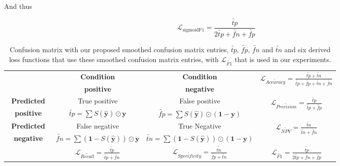 And thus

\begin{equation}
\mathcal{L}_{\text {sigmoidF1}}= \frac{\widetilde{\mathit{tp}}}{2 \widetilde{\mathit{tp}}+ \widetilde{\mathit{fn}}+ \widetilde{\mathit{fp}}}
\end{equation}

 \cite{smoothHinge}

\begin{table}[]
\caption{Confusion matrix with our proposed smoothed confusion matrix entries, $\widetilde{\mathit{tp}}$, $\widetilde{\mathit{fp}}$, $\widetilde{\mathit{fn}}$ and $\widetilde{\mathit{tn}}$ and six derived loss functions that use these smoothed confusion matrix entries, with $\mathcal{L}_{\widetilde{\mathit{F1}}}$ that is used in our experiments.}
\def\arraystretch{1.1}
\begin{tabular}{|c||c|c||c|} \cline{2-4}
\multicolumn{1}{l|}{} & \textbf{Condition} & \textbf{Condition} & \multirow{2}{*}{$\mathcal{L}_{\widetilde{\mathit{Accuracy}}}= \frac{\widetilde{\mathit{tp}} + \widetilde{\mathit{tn}}}{\widetilde{\mathit{tp}} + \widetilde{\mathit{fp}} + \widetilde{\mathit{tn}} + \widetilde{\mathit{fn}}}$} \\
\multicolumn{1}{l|}{} & \textbf{positive} &  \textbf{negative} & \\ \hline \hline
\textbf{~Predicted~} & True positive & False positive & \multirow{2}{*}{$\mathcal{L}_{\widetilde{\mathit{Precision}}}= \frac{\widetilde{\mathit{tp}}}{\widetilde{\mathit{tp}} + \widetilde{\mathit{fp}}}$} \\
\textbf{positive} & $\widetilde{\mathit{tp}}=\sum S(\hat{\mathbf{y}}) \odot \mathbf{y}$ & $\widetilde{\mathit{fp}}= \sum S(\hat{\mathbf{y}}) \odot (\mathbf{1} - \mathbf{y})$ & \\ \hline
\textbf{Predicted} & False negative & True Negative & \multirow{2}{*}{$\mathcal{L}_{\widetilde{\mathit{NPV}}}= \frac{\widetilde{\mathit{tn}}}{\widetilde{\mathit{tn}} + \widetilde{\mathit{fn}}}$} \\
\textbf{negative} & $\widetilde{\mathit{fn}}= \sum (\mathbf{1} - S(\hat{\mathbf{y}})) \odot \mathbf{y}$ & $\widetilde{\mathit{tn}}= \sum (\mathbf{1} - S(\hat{\mathbf{y}})) \odot (\mathbf{1} - \mathbf{y})$ & \\ \hline \hline
\multicolumn{1}{l|}{} & \multirow{2}{*}{\hspace{1.2em}$\mathcal{L}_{\widetilde{\mathit{Recall}}}= \frac{\widetilde{\mathit{tp}}}{\widetilde{\mathit{tp}} + \widetilde{\mathit{fn}}}$\hspace{1.2em}}& \multirow{2}{*}{$\mathcal{L}_{\widetilde{\mathit{Specificity}}}= \frac{\widetilde{\mathit{tn}}}{\widetilde{\mathit{fp}} + \widetilde{\mathit{tn}}}$} & \multirow{2}{*}{$\mathcal{L}_{\widetilde{\mathit{F1}}}= \frac{\widetilde{\mathit{tp}}}{2 \widetilde{\mathit{tp}}+ \widetilde{\mathit{fn}}+ \widetilde{\mathit{fp}}}$} \\
\multicolumn{1}{l|}{} & & & \\
\cline{2-4}
\end{tabular}%
\label{tab:my-table}
\end{table}

